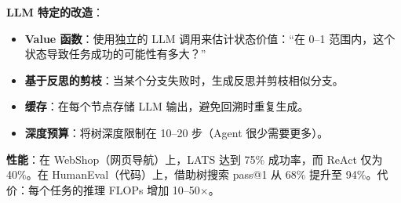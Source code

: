 \textbf{LLM 特定的改造}：

\begin{itemize}
  \item \textbf{Value 函数}：使用独立的 LLM 调用来估计状态价值：``在 0--1 范围内，这个状态导致任务成功的可能性有多大？''
  \item \textbf{基于反思的剪枝}：当某个分支失败时，生成反思并剪枝相似分支。
  \item \textbf{缓存}：在每个节点存储 LLM 输出，避免回溯时重复生成。
  \item \textbf{深度预算}：将树深度限制在 10--20 步（Agent 很少需要更多）。
\end{itemize}

\textbf{性能}：在 WebShop（网页导航）上，LATS 达到 75\% 成功率，而 ReAct 仅为 40\%。在 HumanEval（代码）上，借助树搜索 pass@1 从 68\% 提升至 94\%。代价：每个任务的推理 FLOPs 增加 10--50$\times$。

